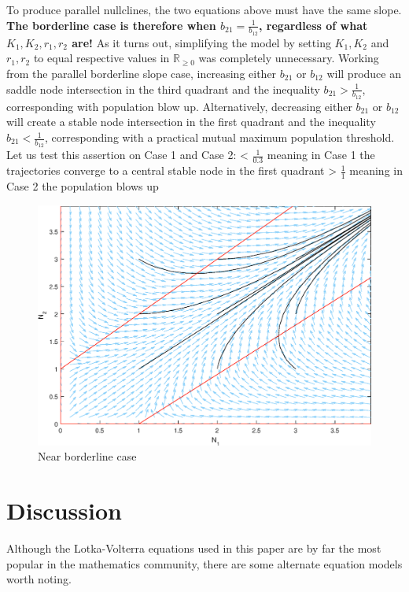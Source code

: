 \documentclass[11pt,a4paper]{scrartcl}
\theoremstyle{definition}
\begin{document}
To produce parallel nullclines, the two equations above must have the same slope. \textbf{The borderline case is therefore when $b_{21}=\frac{1}{b_{12}}$, regardless of what $K_1,K_2,r_1,r_2$ are!} As it turns out, simplifying the model by setting $K_1,K_2$ and $r_1,r_2$ to equal respective values in $\mathbb{R}_{\geqslant 0}$ was completely unnecessary. Working from the parallel borderline slope case, increasing either $b_{21}$ or $b_{12}$ will produce an saddle node intersection in the third quadrant and the inequality $b_{21}>\frac{1}{b_{12}}$, corresponding with population blow up. Alternatively, decreasing either $b_{21}$ or $b_{12}$ will create a stable node intersection in the first quadrant and the inequality $b_{21}<\frac{1}{b_{12}}$, corresponding with a practical mutual maximum population threshold. Let us test this assertion on Case 1 and Case 2: \newline{} < $\frac{1}{0.3}$ meaning in Case 1 the trajectories converge to a central stable node in the first quadrant \checkmark {} > $\frac{1}{1}$ meaning in Case 2 the population blows up \checkmark
\begin{figure}[!ht]
\centering
\includegraphics[scale=.72]{fig4.eps}
\caption{Near borderline case}
\label{figM3}
\end{figure}

\section{Discussion}
\lstset{showstringspaces=false}
Although the Lotka-Volterra equations used in this paper are by far the most popular in the mathematics community, there are some alternate equation models worth noting.\newline
\end{document}
